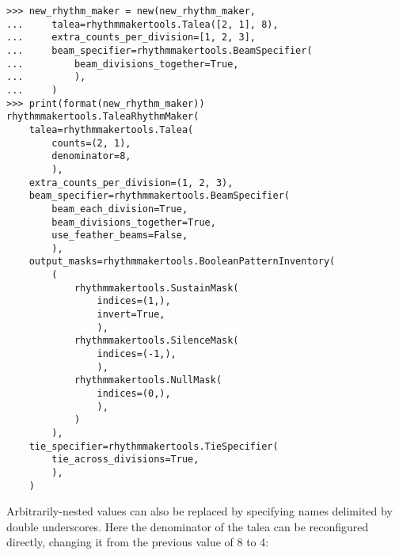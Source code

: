 \begin{abjadbookoutput}
\begin{singlespacing}
\vspace{-0.5\baselineskip}
\begin{lstlisting}
>>> new_rhythm_maker = new(new_rhythm_maker,
...     talea=rhythmmakertools.Talea([2, 1], 8),
...     extra_counts_per_division=[1, 2, 3],
...     beam_specifier=rhythmmakertools.BeamSpecifier(
...         beam_divisions_together=True,
...         ),
...     )
>>> print(format(new_rhythm_maker))
rhythmmakertools.TaleaRhythmMaker(
    talea=rhythmmakertools.Talea(
        counts=(2, 1),
        denominator=8,
        ),
    extra_counts_per_division=(1, 2, 3),
    beam_specifier=rhythmmakertools.BeamSpecifier(
        beam_each_division=True,
        beam_divisions_together=True,
        use_feather_beams=False,
        ),
    output_masks=rhythmmakertools.BooleanPatternInventory(
        (
            rhythmmakertools.SustainMask(
                indices=(1,),
                invert=True,
                ),
            rhythmmakertools.SilenceMask(
                indices=(-1,),
                ),
            rhythmmakertools.NullMask(
                indices=(0,),
                ),
            )
        ),
    tie_specifier=rhythmmakertools.TieSpecifier(
        tie_across_divisions=True,
        ),
    )
\end{lstlisting}
\end{singlespacing}
\end{abjadbookoutput}

Arbitrarily-nested values can also be replaced by specifying names delimited by
double underscores. Here the denominator of the talea can be reconfigured
directly, changing it from the previous value of 8 to 4:

\begin{comment}
<abjad>
new_rhythm_maker = new(new_rhythm_maker,
    talea__denominator=4,
    )
print(format(new_rhythm_maker))
</abjad>
\end{comment}

